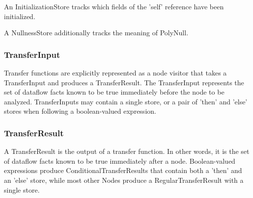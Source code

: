     
    An InitializationStore tracks which fields of the 'self' reference have been initialized.
    
    
    A NullnessStore additionally tracks the meaning of PolyNull.
    


\subsubsection{TransferInput}
\label{sec:transfer_input_classes}

    Transfer functions are explicitly represented as a node visitor that takes a TransferInput and produces a TransferResult.  The TransferInput represents the set of dataflow facts known to be true immediately before the node to be analyzed.  TransferInputs may contain a single store, or a pair of 'then' and 'else' stores when following a boolean-valued expression.


\subsubsection{TransferResult}
\label{sec:transfer_result_classes}

    A TransferResult is the output of a transfer function.  In other words, it is the set of dataflow facts known to be true immediately after a node.  Boolean-valued expressions produce ConditionalTransferResults that contain both a 'then' and an 'else' store, while most other Nodes produce a RegularTransferResult with a single store.

        


